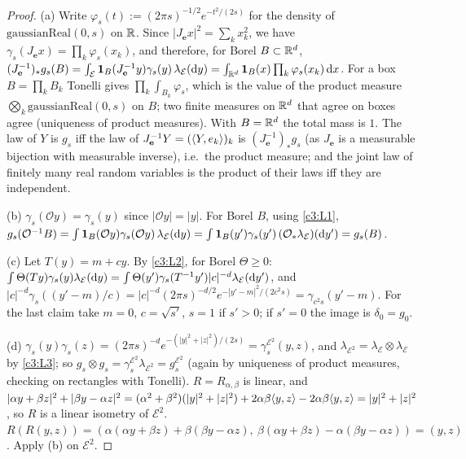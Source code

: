 \begin{proof}
(a) Write $\varphi_s(t):=(2\pi s)^{-1/2}e^{-t^2/(2s)}$ for the density of $\mathrm{gaussianReal}(0,s)$ on $\mathbb{R}$. Since $|J_{\mathbf e}x|^2=\sum_kx_k^2$, we have $\gamma_s(J_{\mathbf e}x)=\prod_k\varphi_s(x_k)$, and therefore, for Borel $B\subset\mathbb{R}^d$,
$(J_{\mathbf e}^{-1})_*g_s(B)=\int_{\mathcal E}\mathbf 1_B(J_{\mathbf e}^{-1}y)\gamma_s(y)\,\lambda_{\mathcal E}(\mathrm{d} y)=\int_{\mathbb{R}^d}\mathbf 1_B(x)\prod_k\varphi_s(x_k)\,\mathrm{d} x$.
For a box $B=\prod_kB_k$ Tonelli gives $\prod_k\int_{B_k}\varphi_s$, which is the value of the product measure $\bigotimes_k\mathrm{gaussianReal}(0,s)$ on $B$; two finite measures on $\mathbb{R}^d$ that agree on boxes agree (uniqueness of product measures). With $B=\mathbb{R}^d$ the total mass is $1$.
The law of $Y$ is $g_s$ iff the law of $J_{\mathbf e}^{-1}Y=(\langle Y,e_k\rangle)_k$ is $(J_{\mathbf e}^{-1})_*g_s$ (as $J_{\mathbf e}$ is a measurable bijection with measurable inverse), i.e.\ the product measure; and the joint law of finitely many real random variables is the product of their laws iff they are independent.

(b) $\gamma_s(\mathcal Oy)=\gamma_s(y)$ since $|\mathcal Oy|=|y|$. For Borel $B$, using \ref{c3:L1},
$g_s(\mathcal O^{-1}B)=\int\mathbf 1_B(\mathcal Oy)\gamma_s(\mathcal Oy)\,\lambda_{\mathcal E}(\mathrm{d} y)=\int\mathbf 1_B(y')\gamma_s(y')\,(\mathcal O_*\lambda_{\mathcal E})(\mathrm{d} y')=g_s(B)$.

(c) Let $T(y)=m+cy$. By \ref{c3:L2}, for Borel $\Theta\ge0$: $\int\Theta(T y)\gamma_s(y)\lambda_{\mathcal E}(\mathrm{d} y)=\int\Theta(y')\gamma_s(T^{-1}y')|c|^{-d}\lambda_{\mathcal E}(\mathrm{d} y')$, and
$|c|^{-d}\gamma_s((y'-m)/c)=|c|^{-d}(2\pi s)^{-d/2}e^{-|y'-m|^2/(2c^2s)}=\gamma_{c^2s}(y'-m)$. For the last claim take $m=0$, $c=\sqrt{s'}$, $s=1$ if $s'>0$; if $s'=0$ the image is $\delta_0=g_0$.

(d) $\gamma_s(y)\gamma_s(z)=(2\pi s)^{-d}e^{-(|y|^2+|z|^2)/(2s)}=\gamma_s^{\mathcal E^2}(y,z)$, and $\lambda_{\mathcal E^2}=\lambda_{\mathcal E}\otimes\lambda_{\mathcal E}$ by \ref{c3:L3}; so $g_s\otimes g_s=\gamma_s^{\mathcal E^2}\lambda_{\mathcal E^2}=g^{\mathcal E^2}_s$ (again by uniqueness of product measures, checking on rectangles with Tonelli).
$R=R_{\alpha,\beta}$ is linear, and
$|\alpha y+\beta z|^2+|\beta y-\alpha z|^2=(\alpha^2+\beta^2)(|y|^2+|z|^2)+2\alpha\beta\langle y,z\rangle-2\alpha\beta\langle y,z\rangle=|y|^2+|z|^2$, so $R$ is a linear isometry of $\mathcal E^2$.
$R(R(y,z))=(\alpha(\alpha y+\beta z)+\beta(\beta y-\alpha z),\ \beta(\alpha y+\beta z)-\alpha(\beta y-\alpha z))=(y,z)$. Apply (b) on $\mathcal E^2$.


\end{proof}
